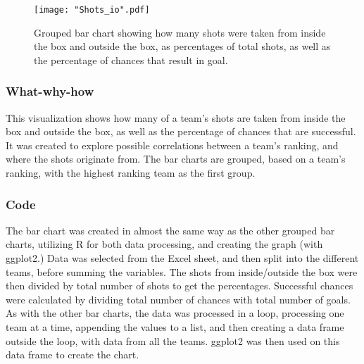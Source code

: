 \documentclass[Report.tex]{subfiles}
\begin{document}
\begin{figure}
\center
\texttt{[image: "Shots\_io".pdf]}
\caption{Grouped bar chart showing how many shots were taken from inside the
box and outside the box, as percentages of total shots, as well as the
percentage of chances that result in goal.}
\label{Fig:Shots_IO} 
\end{figure}

\subsubsection{What-why-how}
This visualization shows how many of a team's shots are taken from inside the
box and outside the box, as well as the percentage of chances that are successful.
It was created to explore possible correlations between a team's ranking, and
where the shots originate from. 
The bar charts are grouped, based on a team's ranking, with the highest ranking
team as the first group. 

\subsubsection{Code}
The bar chart was created in almost the same way as the other grouped bar
charts, utilizing R for both data processing, and creating the graph (with
ggplot2.)
Data was selected from the Excel sheet, and then split into the different teams,
before summing the variables. The shots from inside/outside the box were then
divided by total number of shots to get the percentages. Successful chances were
calculated by dividing total number of chances with total number of goals.
As with the other bar charts, the data was processed in a loop, processing one
team at a time, appending the values to a list, and then creating a data frame
outside the loop, with data from all the teams. ggplot2 was then used on this
data frame to create the chart.
\end{document}
